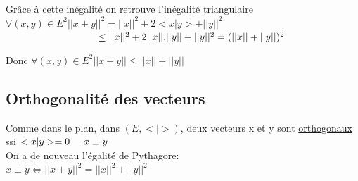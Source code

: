 \documentclass{article}
\newcommand\tab[1][1cm]{\hspace*{#1}}
\begin{document}
Grâce à cette inégalité on retrouve l'inégalité triangulaire \\
$\forall(x,y) \in E^2 ||x + y||^2 = ||x||^2 + 2<x|y> + ||y||^2$ \\
$\tab[3.3cm] \leq ||x||^2 + 2||x||.||y|| + ||y||^2 = (||x|| + ||y||)^2$

Donc $\forall(x, y) \in E^2 ||x + y|| \leq ||x|| + ||y||$

\subsection{Orthogonalité des vecteurs}

Comme dans le plan, dans $(E, <|>)$, deux vecteurs x et y sont \underline{orthogonaux} ssi $<x|y> = 0 \tab[0.5cm] x \perp y$ \\
On a de nouveau l'égalité de Pythagore: \\
$x \perp y \Leftrightarrow ||x + y||^2 = ||x||^2 + ||y||^2$ \\
\end{document}
